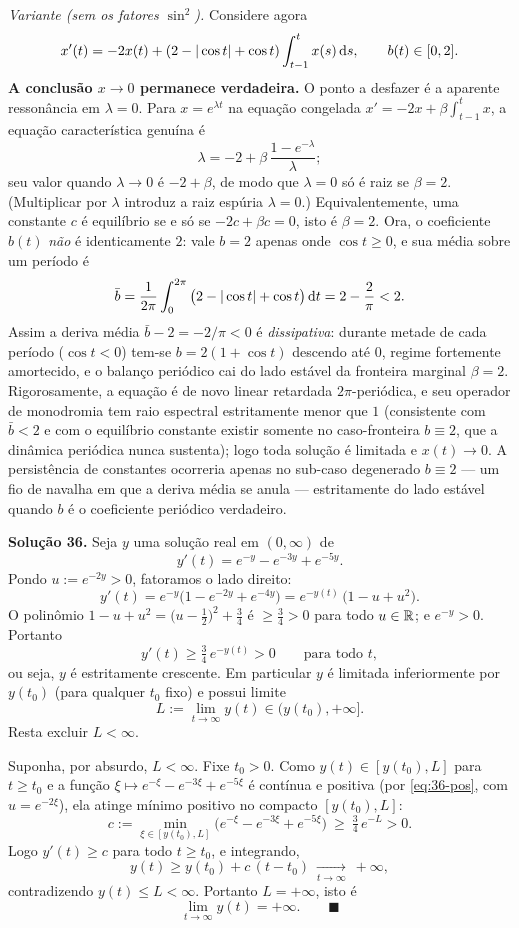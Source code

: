 \medskip
\emph{Variante (sem os fatores $\sin^2$).} Considere agora
\[
x'(t)=-2x(t)+(2-|\cos t|+\cos t)\int_{t-1}^t x(s)\,\mathrm{d} s,\qquad b(t)\in[0,2].
\]
\textbf{A conclusão $x\to0$ permanece verdadeira.} O ponto a desfazer é a aparente ressonância em $\lambda=0$. Para $x=e^{\lambda t}$ na equação congelada $x'=-2x+\beta\int_{t-1}^t x$, a equação característica genuína é
\[
\lambda=-2+\beta\,\frac{1-e^{-\lambda}}{\lambda};
\]
seu valor quando $\lambda\to0$ é $-2+\beta$, de modo que $\lambda=0$ só é raiz se $\beta=2$. (Multiplicar por $\lambda$ introduz a raiz espúria $\lambda=0$.) Equivalentemente, uma constante $c$ é equilíbrio se e só se $-2c+\beta c=0$, isto é $\beta=2$. Ora, o coeficiente $b(t)$ \emph{não} é identicamente $2$: vale $b=2$ apenas onde $\cos t\ge0$, e sua média sobre um período é
\[
\bar b=\frac1{2\pi}\int_0^{2\pi}\big(2-|\cos t|+\cos t\big)\,\mathrm{d} t=2-\frac2\pi<2.
\]
Assim a deriva média $\bar b-2=-2/\pi<0$ é \emph{dissipativa}: durante metade de cada período ($\cos t<0$) tem-se $b=2(1+\cos t)$ descendo até $0$, regime fortemente amortecido, e o balanço periódico cai do lado estável da fronteira marginal $\beta=2$. Rigorosamente, a equação é de novo linear retardada $2\pi$-periódica, e seu operador de monodromia tem raio espectral estritamente menor que $1$ (consistente com $\bar b<2$ e com o equilíbrio constante existir somente no caso-fronteira $b\equiv2$, que a dinâmica periódica nunca sustenta); logo toda solução é limitada e $x(t)\to0$. A persistência de constantes ocorreria apenas no sub-caso degenerado $b\equiv2$ --- um fio de navalha em que a deriva média se anula --- estritamente do lado estável quando $b$ é o coeficiente periódico verdadeiro.


\bigskip\noindent\textbf{Solução 36.}\quad
Seja $y$ uma solução real em $(0,\infty)$ de
\[
y'(t)=e^{-y}-e^{-3y}+e^{-5y}.
\]
Pondo $u:=e^{-2y}>0$, fatoramos o lado direito:
\[
y'(t)=e^{-y}\big(1-e^{-2y}+e^{-4y}\big)=e^{-y(t)}\,\big(1-u+u^2\big).
\]
O polinômio $1-u+u^2=\big(u-\tfrac12\big)^2+\tfrac34$ é $\ge\tfrac34>0$ para todo $u\in\mathbb{R}$; e $e^{-y}>0$. Portanto
\begin{equation}\label{eq:36-pos}
y'(t)\ge \tfrac34\,e^{-y(t)}>0\qquad\text{para todo }t,
\end{equation}
ou seja, $y$ é estritamente crescente. Em particular $y$ é limitada inferiormente por $y(t_0)$ (para qualquer $t_0$ fixo) e possui limite
\[
L:=\lim_{t\to\infty}y(t)\in\big(y(t_0),+\infty\big].
\]
Resta excluir $L<\infty$.

Suponha, por absurdo, $L<\infty$. Fixe $t_0>0$. Como $y(t)\in[y(t_0),L]$ para $t\ge t_0$ e a função $\xi\mapsto e^{-\xi}-e^{-3\xi}+e^{-5\xi}$ é contínua e positiva (por \eqref{eq:36-pos}, com $u=e^{-2\xi}$), ela atinge mínimo positivo no compacto $[y(t_0),L]$:
\[
c:=\min_{\xi\in[y(t_0),L]}\big(e^{-\xi}-e^{-3\xi}+e^{-5\xi}\big)\ \ge\ \tfrac34\,e^{-L}>0.
\]
Logo $y'(t)\ge c$ para todo $t\ge t_0$, e integrando,
\[
y(t)\ge y(t_0)+c\,(t-t_0)\ \xrightarrow[t\to\infty]{}\ +\infty,
\]
contradizendo $y(t)\le L<\infty$. Portanto $L=+\infty$, isto é
\[
\lim_{t\to\infty}y(t)=+\infty. \qquad\blacksquare
\]

